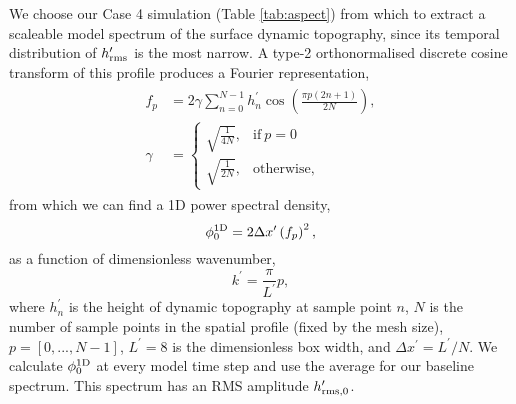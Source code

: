 We choose our Case 4 simulation (Table \ref{tab:aspect}) from which to extract a scaleable model spectrum of the surface dynamic topography, since its temporal distribution of $h_{\rm rms}^\prime$ is the most narrow. A type-2 orthonormalised discrete cosine transform of this profile produces a Fourier representation,
\begin{align}
    \begin{split}
    f_p &= 2 \gamma \sum_{n=0}^{N-1} h_n^\prime \cos \left( \frac{\pi p (2n + 1)}{2N}\right),\\
    \gamma &= 
    \begin{cases}
      \sqrt{\frac{1}{4N}}, & \text{if}\ p=0 \\
      \sqrt{\frac{1}{2N}}, & \text{otherwise,}
    \end{cases}
\end{split}
\end{align}
from which we can find a 1D power spectral density,
\begin{equation}
    \phi^{\rm 1D}_0 = 2 \Delta x^\prime \left(f_p\right)^2,
\end{equation}
as a function of dimensionless wavenumber,
\begin{equation}
    k^\prime = \frac{\pi}{L^\prime} p,
\end{equation}
where $h_n^\prime$ is the height of dynamic topography at sample point $n$, $N$ is the number of sample points in the spatial profile (fixed by the mesh size), $p = [0, ..., N - 1]$, $L^\prime = 8$ is the dimensionless box width, and $\Delta x^\prime = L^\prime / N$. We calculate $\phi^{\rm 1D}_0$ at every model time step and use the average for our baseline spectrum. This spectrum has an RMS amplitude $h^{\prime}_{\rm rms, 0}$. 

